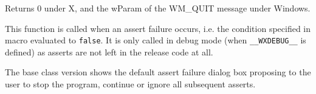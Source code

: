 
Returns 0 under X, and the wParam of the WM\_QUIT message under Windows.



\label{wxapponassertfailure}


This function is called when an assert failure occurs, i.e. the condition
specified in  macro evaluated to {\tt false}.
It is only called in debug mode (when {\tt \_\_WXDEBUG\_\_} is defined) as
asserts are not left in the release code at all.

The base class version shows the default assert failure dialog box proposing to
the user to stop the program, continue or ignore all subsequent asserts.






